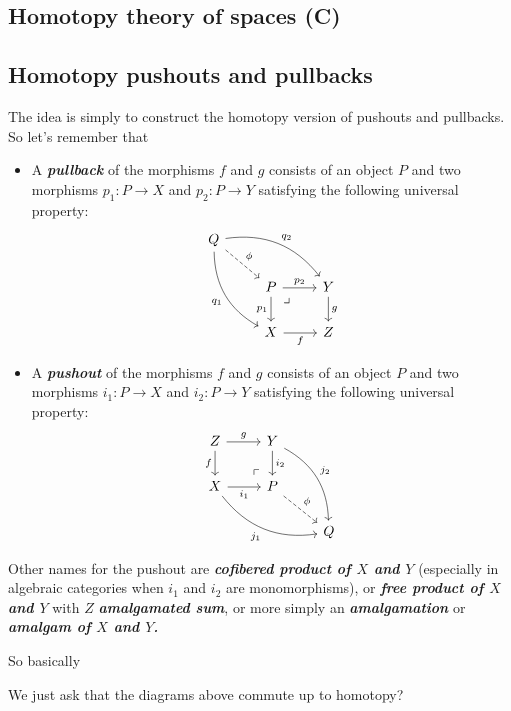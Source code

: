 \begin{remark}
\section{Homotopy theory of spaces (C)}

\subsection{Homotopy pushouts and pullbacks}
The idea is simply to construct the homotopy version of pushouts and pullbacks. So let's remember that
\begin{definition}\leavevmode 
	\begin{itemize}
		\item A \textbf{\textit{pullback}} of the morphisms $f$ and $g$ consists of an object $P$ and two morphisms $p_1:P\to X$ and $p_2:P\to Y$ satisfying the following universal property:
		$$\begin{tikzcd}
			Q\arrow[rrd,bend left,"q_2"]\arrow[ddr,"q_1",swap,bend right]\arrow[dr,dashed,"\phi"]\\
			&P\arrow[r,"p_2"] \arrow[rd, phantom, "\lrcorner", very near start]\arrow[d,"p_1",swap]&Y\arrow[d,"g"]\\
			&X\arrow[r,"f",swap]&Z
		\end{tikzcd}$$
		\item A \textbf{\textit{pushout}} of the morphisms $f$ and $g$ consists of an object $P$ and two morphisms $i_1:P\to X$ and $i_2:P\to Y$ satisfying the following universal property:
		$$\begin{tikzcd}
			Z\arrow[r,"g"]\arrow[d,swap,"f"]&Y\arrow[d,"i_2"]\arrow[ddr,bend left,"j_2"]\\
			X\arrow[r,"i_1",swap]\arrow[drr,bend right,swap,"j_1"]&P\arrow[ul, phantom, "\ulcorner", very near start]\arrow[dr,dashed,"\phi"]\\
			&&Q
		\end{tikzcd}$$
	\end{itemize}
		\begin{remark}
			Other names for the pushout are \textbf{\textit{cofibered product of $X$ and $Y$}} (especially in algebraic categories when $i_1$ and $i_2$ are monomorphisms), or \textbf{\textit{free product of $X$ and $Y$}} with $Z$ \textbf{\textit{amalgamated sum}}, or more simply an \textbf{\textit{amalgamation}} or \textbf{\textit{amalgam of $X$ and $Y$.}}
		\end{remark}
So basically
\begin{definition}
	{\color{magenta}We just ask that the diagrams above commute up to homotopy?}

\end{definition}
\end{definition}
\end{remark}
